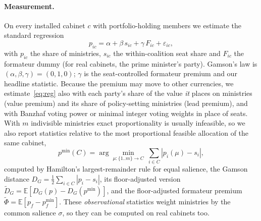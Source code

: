 \documentclass[11pt,a4paper]{article}
\newcommand{\E}{\mathbb{E}}
\begin{document}
\paragraph{Measurement.} On every installed cabinet $c$ with portfolio-holding members we estimate the
standard regression
\begin{equation}\label{eq:reg}
p_{ic}=\alpha+\beta\,s_{ic}+\gamma\,F_{ic}+\varepsilon_{ic},
\end{equation}
with $p_{ic}$ the share of ministries, $s_{ic}$ the within-coalition seat share and $F_{ic}$ the
formateur dummy (for real cabinets, the prime minister's party). Gamson's law is
$(\alpha,\beta,\gamma)=(0,1,0)$; $\gamma$ is the seat-controlled formateur premium and our headline
statistic. Because the premium may move to other currencies, we estimate~\eqref{eq:reg} also with each
party's share of the value \emph{it} places on ministries (value premium) and its share of policy-setting
ministries (lead premium), and with Banzhaf voting power or minimal integer voting weights in place of seats. With $m$ indivisible
ministries exact proportionality is usually infeasible, so we also report statistics relative to the most
proportional feasible allocation of the same cabinet,
\[
p^{\min}(C)=\arg\min_{\mu:\{1..m\}\to C}\ \textstyle\sum_{i\in C}|p_i(\mu)-s_i|,
\]
computed by Hamilton's largest-remainder rule for equal salience,
the Gamson distance $D_G=\tfrac12\sum_{i\in C}|p_i-s_i|$, its floor-adjusted version
$\tilde D_G=\E[D_G(p)-D_G(p^{\min})]$, and the floor-adjusted formateur premium $\tilde\Phi=\E[p_f-p^{\min}_f]$. These \emph{observational}
statistics weight ministries by the common salience $\sigma$, so they can be computed on real cabinets too.
\end{document}
